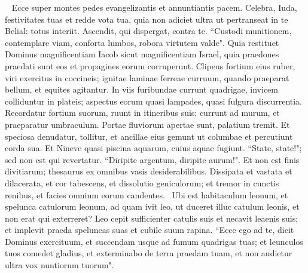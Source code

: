 \begin{biblechapter}   
\verse Ecce super montes pedes evangelizantis et annuntiantis pacem. Celebra, Iuda, festivitates tuas et redde vota tua, quia non adiciet ultra ut pertranseat in te Belial: totus interiit. 
\verse Ascendit, qui dispergat, contra te. “Custodi munitionem, contemplare viam, conforta lumbos, robora virtutem valde". 
\verse Quia restituet Dominus magnificentiam Iacob sicut magnificentiam Israel, quia praedones praedati sunt eos et propagines eorum corruperunt. 
\verse Clipeus fortium eius ruber, viri exercitus in coccineis; ignitae laminae ferreae curruum, quando praeparat bellum, et equites agitantur. 
\verse In viis furibundae currunt quadrigae, invicem colliduntur in plateis; aspectus eorum quasi lampades, quasi fulgura discurrentia. 
\verse Recordatur fortium suorum, ruunt in itineribus suis; currunt ad murum, et praeparatur umbraculum. 
\verse Portae fluviorum apertae sunt, palatium tremit. 
\verse Et speciosa denudatur, tollitur, et ancillae eius gemunt ut columbae et percutiunt corda sua. 
\verse Et Nineve quasi piscina aquarum, cuius aquae fugiunt. “State, state!"; sed non est qui revertatur. 
\verse “Diripite argentum, diripite aurum!". Et non est finis divitiarum; thesaurus ex omnibus vasis desiderabilibus. 
\verse Dissipata et vastata et dilacerata, et cor tabescens, et dissolutio geniculorum; et tremor in cunctis renibus, et facies omnium eorum candentes.  
\verse Ubi est habitaculum leonum, et spelunca catulorum leonum, ad quam ivit leo, ut duceret illuc catulum leonis, et non erat qui exterreret? 
\verse Leo cepit sufficienter catulis suis et necavit leaenis suis; et implevit praeda speluncas suas et cubile suum rapina. 
\verse “Ecce ego ad te, dicit Dominus exercituum, et succendam usque ad fumum quadrigas tuas; et leunculos tuos comedet gladius, et exterminabo de terra praedam tuam, et non audietur ultra vox nuntiorum tuorum". 
\end{biblechapter}

